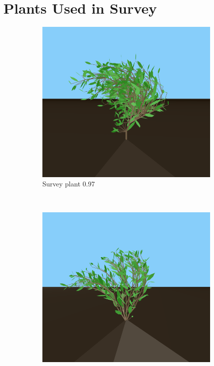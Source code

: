 \chapter{Plants Used in Survey}
\begin{figure}
    \centering
    \begin{subfigure}{0.48\textwidth}
        \includegraphics[width=\textwidth]{figures/plant-97}
        \caption{Survey plant 0.97}
    \end{subfigure}
    ~
    \begin{subfigure}{0.48\textwidth}
        \includegraphics[width=\textwidth]{figures/plant-91}

\end{subfigure}
\end{figure}
